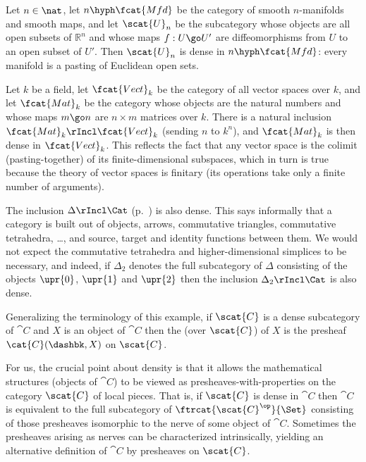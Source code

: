 \begin{example}
Let $n\in\nat$, let $n\hyph\fcat{Mfd}$ be the category of smooth
$n$-manifolds%
%
%
and smooth maps, and let $\scat{U}_n$ be the subcategory
whose objects are all open subsets of $\mathbb{R}^n$ and whose maps $f: U
\go U'$ are diffeomorphisms from $U$ to an open subset of $U'$.  Then
$\scat{U}_n$ is dense in $n\hyph\fcat{Mfd}$: every manifold is a pasting of
Euclidean open sets.
\end{example}

\begin{example}
Let $k$ be a field, let $\fcat{Vect}_k$ be the category of all vector%
%
%
spaces over $k$, and let $\fcat{Mat}_k$%
% 
% 
be the category whose objects are
the natural numbers and whose maps $m\go n$ are $n\times m$ matrices%
%
%
over
$k$.  There is a natural inclusion $\fcat{Mat}_k \rIncl \fcat{Vect}_k$
(sending $n$ to $k^n$), and $\fcat{Mat}_k$ is then dense in
$\fcat{Vect}_k$.  This reflects the fact that any vector space is the
colimit (pasting-together) of its finite-dimensional subspaces, which in
turn is true because the theory of vector spaces is finitary (its
operations take only a finite number of arguments).  
\end{example}

\begin{example}
The inclusion $\Delta \rIncl \Cat$%
%
%
(p.~\pageref{p:defn-nerve}) is also
dense.  This says informally that a category is built out of objects,
arrows, commutative triangles, commutative tetrahedra, \ldots, and source,
target and identity functions between them.  We would not expect the
commutative tetrahedra and higher-dimensional simplices to be necessary,
and indeed, if $\Delta_2$ denotes the full subcategory of $\Delta$
consisting of the objects $\upr{0}$, $\upr{1}$ and $\upr{2}$ then the
inclusion $\Delta_2 \rIncl \Cat$ is also dense.
\end{example}
%
Generalizing the terminology of this example, if $\scat{C}$ is a dense
subcategory of $\cat{C}$ and $X$ is an object of $\cat{C}$ then the
%
%
%
(over $\scat{C}$) of $X$ is the presheaf $\cat{C}(\dashbk,
X)$ on $\scat{C}$.

For us, the crucial point about density is that it allows the mathematical
structures (objects of $\cat{C}$) to be viewed as
presheaves-with-properties%
%
%
on the category $\scat{C}$ of local pieces.
That is, if $\scat{C}$ is dense in $\cat{C}$ then $\cat{C}$ is equivalent
to the full subcategory of $\ftrcat{\scat{C}^\op}{\Set}$ consisting of
those presheaves isomorphic to the nerve of some object of $\cat{C}$.
Sometimes the presheaves arising as nerves can be characterized
intrinsically, yielding an alternative definition of $\cat{C}$ by
presheaves on $\scat{C}$.

